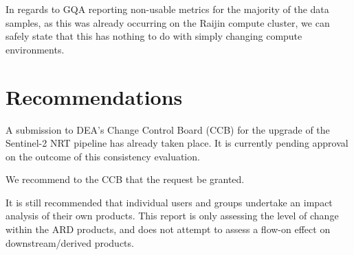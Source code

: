 \documentclass[a4paper]{article}
\begin{document}
    \begin{flushleft}
      In regards to GQA reporting non-usable metrics for the majority of the data samples, as this was already occurring on the Raijin compute cluster, we can safely state that this has nothing to do with simply changing compute environments.
    \end{flushleft}

  \section{Recommendations}

    \begin{flushleft}
      A submission to DEA's Change Control Board (CCB) for the upgrade of the Sentinel-2 NRT pipeline has already taken place. It is currently pending approval on the outcome of this consistency evaluation. \par
      We recommend to the CCB that the request be granted. \par
      It is still recommended that individual users and groups undertake an impact analysis of their own products. This report is only assessing the level of change within the ARD products, and does not attempt to assess a flow-on effect on downstream/derived products. \par
    \end{flushleft}
\end{document}
